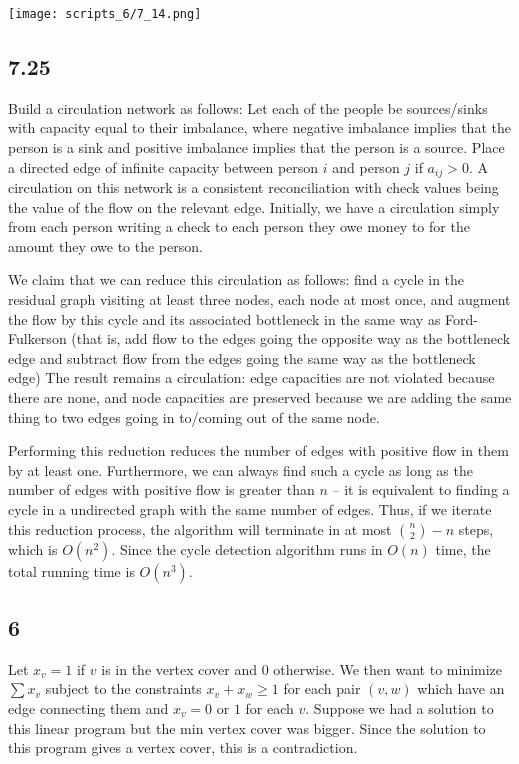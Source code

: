 \documentclass{article}
\begin{document}
\texttt{[image: scripts\_6/7\_14.png]}
\subsection*{7.25}
Build a circulation network as follows: Let each of the people be sources/sinks with capacity equal to their imbalance, where negative imbalance implies that the person is a sink and positive imbalance implies that the person is a source. Place a directed edge of infinite capacity between person $i$ and person $j$ if $a_{ij}>0$. A circulation on this network is a consistent reconciliation with check values being the value of the flow on the relevant edge. Initially, we have a circulation simply from each person writing a check to each person they owe money to for the amount they owe to the person. 

We claim that we can reduce this circulation as follows: find a cycle in the residual graph visiting at least three nodes, each node at most once, and augment the flow by this cycle and its associated bottleneck in the same way as Ford-Fulkerson (that is, add flow to the edges going the opposite way as the bottleneck edge and subtract flow from the edges going the same way as the bottleneck edge) The result remains a circulation: edge capacities are not violated because there are none, and node capacities are preserved because we are adding the same thing to two edges going in to/coming out of the same node. 

Performing this reduction reduces the number of edges with positive flow in them by at least one. Furthermore, we can always find such a cycle as long as the number of edges with positive flow is greater than $n$ -- it is equivalent to finding a cycle in a undirected graph with the same number of edges. Thus, if we iterate this reduction process, the algorithm will terminate in at most $\binom{n}{2}-n$ steps, which is $O(n^2)$. Since the cycle detection algorithm runs in $O(n)$ time, the total running time is $O(n^3)$.
\subsection*{6}
Let $x_v=1$ if $v$ is in the vertex cover and $0$ otherwise. We then want to minimize $\sum x_v$ subject to the constraints $x_v+x_w\geq 1$ for each pair $(v,w)$ which have an edge connecting them and $x_v=0$ or $1$ for each $v$. Suppose we had a solution to this linear program but the min vertex cover was bigger. Since the solution to this program gives a vertex cover, this is a contradiction.
\end{document}
